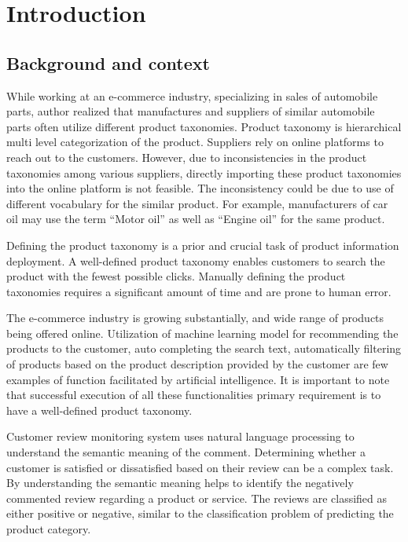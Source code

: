 \chapter{Introduction}

\section{Background and context}

While working at an e-commerce industry, specializing in sales of automobile parts, author realized that manufactures and suppliers of similar automobile parts often utilize different product taxonomies. Product taxonomy is hierarchical multi level categorization of the product.  Suppliers rely on online platforms to reach out to the customers. However, due to inconsistencies in the product taxonomies among various suppliers, directly importing these product taxonomies into the online platform is not feasible. The inconsistency could be due to use of different vocabulary for the similar product. For example, manufacturers of car oil may use the term ``Motor oil'' as well as ``Engine oil'' for the same product. 

Defining the product taxonomy is a prior and crucial task of product information deployment. A well-defined product taxonomy enables customers to search the product with the fewest possible clicks.  Manually defining the product taxonomies requires a significant amount of time and are prone to human error. 

The e-commerce industry is growing substantially, and wide range of products being offered online. Utilization of machine learning model for recommending the products to the customer, auto completing the search text, automatically filtering of products based on the product description provided by the customer are few examples of function facilitated by artificial intelligence. It is important to note that successful execution of all these functionalities primary requirement is to have a well-defined product taxonomy.

 Customer review monitoring system uses natural language processing to understand the semantic meaning of the comment. Determining whether a customer is satisfied or dissatisfied based on their review can be a complex task. By understanding the semantic meaning helps to identify the negatively commented review regarding a product or service. The reviews are classified as either positive or negative, similar to the classification problem of predicting the product category. 
 
